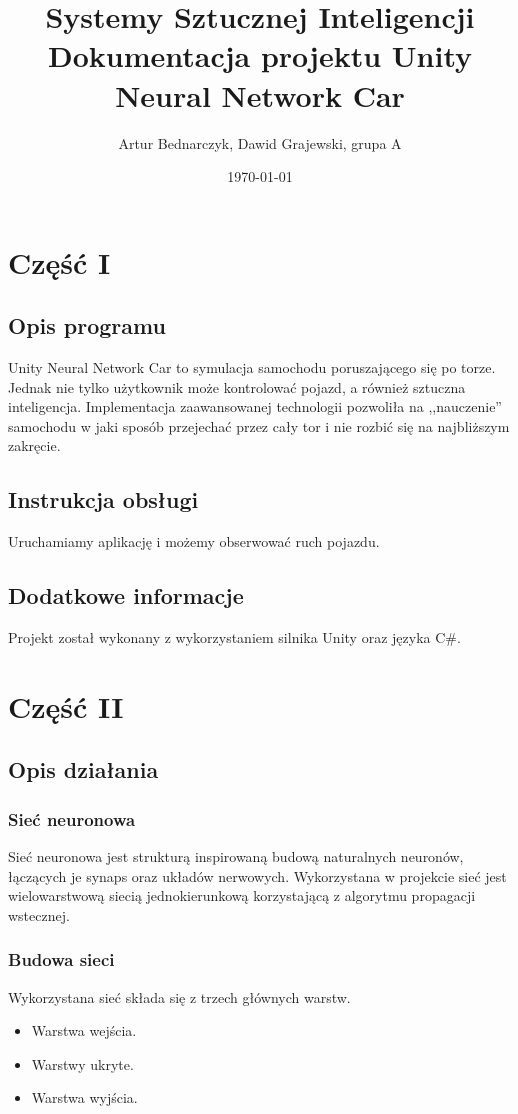 \documentclass[12pt,a4paper]{article}
\begin{document}
	
	\title{Systemy Sztucznej Inteligencji\\\small{Dokumentacja projektu Unity Neural Network Car}}
	\author{Artur Bednarczyk, Dawid Grajewski, grupa A}
	\date{\today}

	\maketitle
	\newpage
	\section*{Część I}
	\subsection*{Opis programu}
	Unity Neural Network Car to symulacja samochodu poruszającego się po torze. Jednak nie tylko użytkownik może kontrolować pojazd, a również sztuczna inteligencja. Implementacja zaawansowanej technologii pozwoliła na ,,nauczenie'' samochodu w jaki sposób przejechać przez cały tor i nie rozbić się na najbliższym zakręcie.
	\subsection*{Instrukcja obsługi}
	Uruchamiamy aplikację i możemy obserwować ruch pojazdu.
	\subsection*{Dodatkowe informacje}
	Projekt został wykonany z wykorzystaniem silnika Unity oraz języka C\#.
	\newpage
	\section*{Część II}
	\subsection*{Opis działania} 
\subsubsection*{Sieć neuronowa}
Sieć neuronowa jest strukturą inspirowaną budową naturalnych neuronów, łączących je synaps oraz układów nerwowych. Wykorzystana w projekcie sieć jest wielowarstwową siecią jednokierunkową korzystającą z algorytmu propagacji wstecznej.
\subsubsection*{Budowa sieci}
Wykorzystana sieć składa się z trzech głównych warstw.
\begin{itemize}
	\item Warstwa wejścia.
	\item Warstwy ukryte.
	\item Warstwa wyjścia.
\end{itemize}
\end{document}
